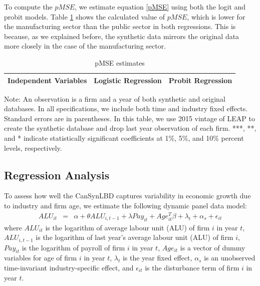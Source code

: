 \documentclass{article}
\begin{document}
To compute the $pMSE$, we estimate equation \ref{pMSE} using both the logit and probit models. Table \ref{pMSE_regression}   shows the calculated value of $pMSE$, which is lower for the manufacturing sector than the public sector in both regressions. This is because, as we explained before, the synthetic data mirrors the original data more closely in the case of the manufacturing sector.

\begin{table}[H]
  \centering
\begin{threeparttable}
 \caption{pMSE estimates} \label{pMSE_regression} \medskip
\renewcommand{\arraystretch}{1}
\begin{tabular}{l|c c| c c}
\toprule
\textbf{Independent Variables}&\multicolumn{2}{c|}{\textbf{Logistic Regression}} &  \multicolumn{2}{c}{\textbf{Probit Regression}}\\
\midrule

   \bottomrule
  \end{tabular} 
\begin{tablenotes}
\small
\item Note: An observation is a firm and a year of both synthetic and original databases. In all specifications, we include both time and industry fixed effects. Standard errors are in parentheses. In this table, we use 2015 vintage of LEAP to create the synthetic database and drop last year observation of each firm. ***, **, and * indicate statistically significant coefficients at 1\%, 5\%, and 10\% percent levels, respectively.
 \end{tablenotes}
 \end{threeparttable}
\end{table}

\subsection{Regression Analysis}

To assess how well the CanSynLBD captures variability in economic growth due to industry and firm age, we estimate the following dynamic panel data model:
\begin{eqnarray}	
ALU_{it} & = & \alpha + \theta ALU_{i,t-1} + \lambda Pay_{it} + Age_{it}^{T}\beta + \lambda_t + \alpha_s + \epsilon_{it}
\end{eqnarray}
where $ALU_{it}$ is the logarithm of average labour unit (ALU) of firm $i$ in year $t$, $ALU_{i,t-1}$ is the logarithm of last year's average labour unit (ALU) of firm $i$, $Pay_{it}$ is the logarithm of payroll of firm $i$ in year $t$, $Age_{it}$ is a vector of dummy variables for age of firm $i$ in year $t$, $\lambda_t$ is the year fixed effect, $\alpha_s$ is an unobserved time-invariant industry-specific effect, and $\epsilon_{it}$ is the disturbance term of firm $i$ in year $t$. 
\end{document}

